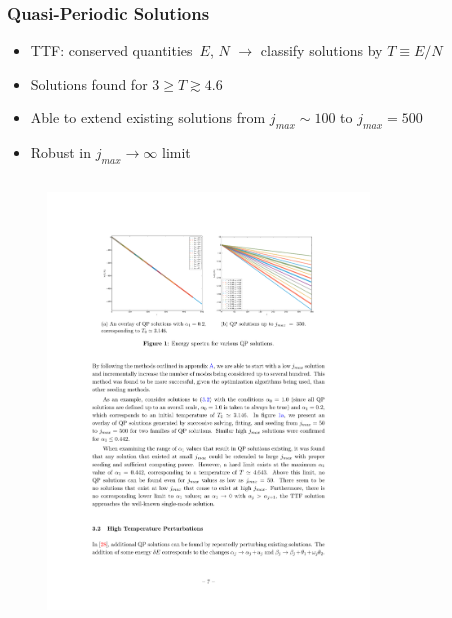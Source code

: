 \documentclass[mathserif,10pt]{beamer}
\newcommand{\bi}{\begin{itemize}}
\newcommand{\ei}{\end{itemize}}
\newcommand{\its}{\item}
\newcommand{\jm}{j_{max}}
\begin{document}
\frame
{
  \frametitle{Quasi-Periodic Solutions}
  \bi
  \its TTF: conserved quantities\footnotemark\ $E$, $N$ $\to$ classify solutions by $T \equiv E/N$
  \its Solutions found for $3 \geq T \gtrsim 4.6$
  \its Able to extend existing solutions from $\jm \sim 100$ to $\jm = 500$
  \its Robust in $\jm \to \infty$ limit
  \ei
  
  \vspace{-0.1in}
  \begin{columns}
  \begin{figure}
  \centering
  \includegraphics[scale=0.75]{largejmax} 
  \end{figure}
  \begin{figure}
  \centering

\end{figure}
\end{columns}}
\end{document}
